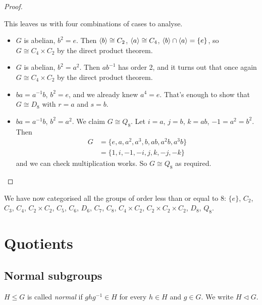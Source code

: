 \documentclass{../../template/note}
\begin{document}
\begin{proof}
\begin{itemize}
            This leaves us with four combinations of cases to analyse.
            \begin{itemize}
                \item \(G\) is abelian, \(b^2 = e\). Then \(\left \langle b \right \rangle \cong C_2\), \(\left \langle a \right \rangle \cong C_4\), \(\left \langle b \right \rangle \cap \left \langle a \right \rangle = \{e\}\), so \(G \cong C_4 \times C_2\) by the direct product theorem.
                \item \(G\) is abelian, \(b^2 = a^2\). Then \(ab^{-1}\) has order 2, and it turns out that once again \(G \cong C_4 \times C_2\) by the direct product theorem.
                \item \(ba = a^{-1}b\), \(b^2 = e\), and we already knew \(a^4 = e\). That's enough to show that \(G \cong D_8\) with \(r = a\) and \(s = b\).
                \item \(ba = a^{-1}b\), \(b^2 = a^2\). We claim \(G \cong Q_8\). Let \(i = a\), \(j = b\), \(k = ab\), \(-1 = a^2 = b^2\). Then
                \begin{align*}
                    G &= \{e, a, a^2, a^3, b, ab, a^2b, a^3b\} \\
                    &= \{1, i, -1, -i, j, k, -j, -k\}
                \end{align*}
                and we can check multiplication works. So \(G \cong Q_8\) as required.
            \end{itemize}
        \end{itemize}
    \end{proof}
    
    We have now categorised all the groups of order less than or equal to 8: \(\{e\}\), \(C_2\), \(C_3\), \(C_4\), \(C_2 \times C_2\), \(C_5\), \(C_6\), \(D_6\), \(C_7\), \(C_8\), \(C_4 \times C_2\), \(C_2 \times C_2 \times C_2\), \(D_8\), \(Q_8\).

    \section{Quotients}
    
    \subsection{Normal subgroups}

    \begin{definition}
        \(H \leq G\) is called \emph{normal} if \(ghg^{-1} \in H\) for every \(h \in H\) and \(g \in G\). We write \(H \triangleleft G\).
    \end{definition}
    
\end{document}
